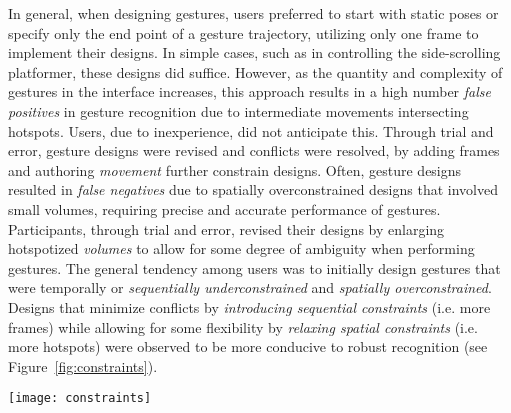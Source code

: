 In general, when designing gestures, users preferred to start with static poses or specify only the end point of a gesture trajectory, utilizing only one frame to implement their designs. In simple cases, such as in controlling the side-scrolling platformer, these designs did suffice. However, as the quantity and complexity of gestures in the interface increases, this approach results in a high number \emph{false positives} in gesture recognition due to intermediate movements intersecting hotspots. Users, due to inexperience, did not anticipate this. Through trial and error, gesture designs were revised and conflicts were resolved, by adding frames and authoring \emph{movement} further constrain designs. Often, gesture designs resulted in \emph{false negatives} due to spatially overconstrained designs that involved small volumes, requiring precise and accurate performance of gestures. Participants, through trial and error, revised their designs by enlarging hotspotized \emph{volumes} to allow for some degree of ambiguity when performing gestures. The general tendency among users was to initially design gestures that were temporally or \emph{sequentially underconstrained} and \emph{spatially overconstrained}. Designs that minimize conflicts by \emph{introducing sequential constraints} (i.e. more frames) while allowing for some flexibility by \emph{relaxing spatial constraints} (i.e. more hotspots) were observed to be more conducive to robust recognition (see Figure~\ref{fig:constraints}).

\begin{SCfigure}[\sidecaptionrelwidth][ht]
\centering
\texttt{[image: constraints]}
\caption{Initially, users preferred gesture designs that involved small hotspots and unspecified motion. Frames were added to constrain motion, and hotspots were enlarge to allow for variations during gesturing. Here, both panes depict hotspot configurations that may be used for a "punch" gesture. The configuration on the right is more conducive to robust recognition because of its sequentially constrained and spatially relaxed nature, compared to the rather extremely simplistic design on the left.}
\label{fig:constraints}
\end{SCfigure}

